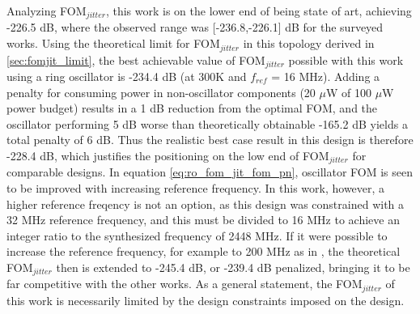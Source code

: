 Analyzing FOM$_{jitter}$, this work is on the lower end of being state of art, achieving -226.5 dB, where the observed range was [-236.8,-226.1] dB for the surveyed works. Using the theoretical limit for FOM$_{jitter}$ in this topology derived in \ref{sec:fomjit_limit}, the best achievable value of FOM$_{jitter}$ possible with this work using a ring oscillator is -234.4 dB (at 300K and $f_{ref}$ = 16 MHz). Adding a penalty for consuming power in non-oscillator components (20 $\mu$W of 100 $\mu$W power budget) results in a 1 dB reduction from the optimal FOM, and the oscillator performing 5 dB worse than theoretically obtainable -165.2 dB yields a total penalty of 6 dB. Thus the realistic best case result in this design is therefore -228.4 dB, which justifies the positioning on the low end of FOM$_{jitter}$ for comparable designs. In equation \ref{eq:ro_fom_jit_fom_pn}, oscillator FOM is seen to be improved with increasing reference frequency. In this work, however, a higher reference freqency is not an option, as this design was constrained with a 32 MHz reference frequency, and this must be divided to 16 MHz to achieve an integer ratio to the synthesized frequency of 2448 MHz. If it were possible to increase the reference frequency, for example to 200 MHz as in \cite{Xiang2020}, the theoretical FOM$_{jitter}$ then is extended to -245.4 dB, or -239.4 dB penalized, bringing it to be far competitive with the other works. As a general statement, the FOM$_{jitter}$ of this work is necessarily limited by the design constraints imposed on the design.

